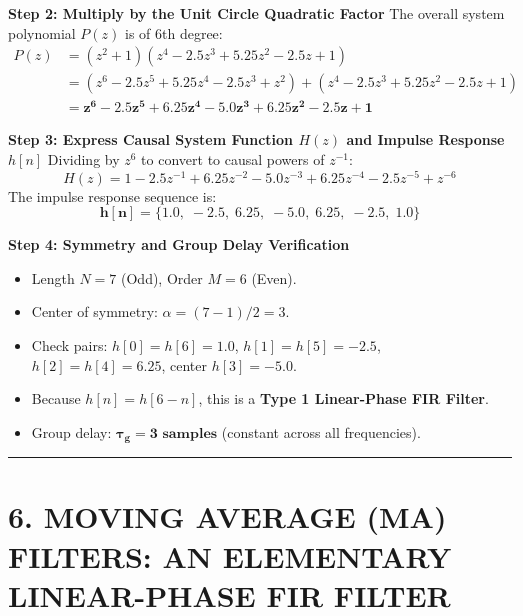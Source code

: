 \documentclass[11pt,a4paper]{article}
\begin{document}
\vspace{1mm}
\noindent\textbf{Step 2: Multiply by the Unit Circle Quadratic Factor}
The overall system polynomial $P(z)$ is of 6th degree:
\begin{align}
P(z) &= (z^2 + 1)(z^4 - 2.5 z^3 + 5.25 z^2 - 2.5 z + 1) \nonumber \\
&= (z^6 - 2.5 z^5 + 5.25 z^4 - 2.5 z^3 + z^2) + (z^4 - 2.5 z^3 + 5.25 z^2 - 2.5 z + 1) \nonumber \\
&= \mathbf{z^6 - 2.5 z^5 + 6.25 z^4 - 5.0 z^3 + 6.25 z^2 - 2.5 z + 1}
\end{align}

\vspace{1mm}
\noindent\textbf{Step 3: Express Causal System Function $H(z)$ and Impulse Response $h[n]$}
Dividing by $z^6$ to convert to causal powers of $z^{-1}$:
\begin{equation}
H(z) = 1 - 2.5 z^{-1} + 6.25 z^{-2} - 5.0 z^{-3} + 6.25 z^{-4} - 2.5 z^{-5} + z^{-6}
\end{equation}
The impulse response sequence is:
\begin{equation}
\mathbf{h[n] = \{1.0, \; -2.5, \; 6.25, \; -5.0, \; 6.25, \; -2.5, \; 1.0\}}
\end{equation}

\vspace{1mm}
\noindent\textbf{Step 4: Symmetry and Group Delay Verification}
\begin{itemize}
    \item Length $N = 7$ (Odd), Order $M = 6$ (Even).
    \item Center of symmetry: $\alpha = (7-1)/2 = 3$.
    \item Check pairs: $h[0]=h[6]=1.0$, $h[1]=h[5]=-2.5$, $h[2]=h[4]=6.25$, center $h[3]=-5.0$.
    \item Because $h[n] = h[6-n]$, this is a \textbf{Type 1 Linear-Phase FIR Filter}.
    \item Group delay: $\mathbf{\tau_g = 3 \text{ samples}}$ (constant across all frequencies).
\end{itemize}

\noindent\rule{\textwidth}{0.5pt}

\section{6. MOVING AVERAGE (MA) FILTERS: AN ELEMENTARY LINEAR-PHASE FIR FILTER}
\end{document}
